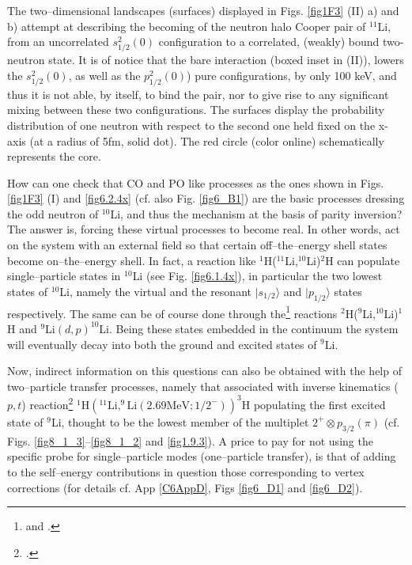  The two--dimensional landscapes (surfaces) displayed in Figs. \ref{fig1F3} (II) a) and b) attempt at describing the becoming of the neutron halo     Cooper pair  of  $^{11}$Li,  from an uncorrelated $s_{1/2}^2(0)$  configuration to a  correlated, (weakly) bound two-neutron state. It is of notice that  the bare interaction (boxed inset in  (II)), lowers the $s_{1/2}^2(0)$, as well as the $p_{1/2}^2(0)$) pure  configurations,  by  only 100 keV, and thus it is not able, by itself,  to bind the pair, nor to give rise to any significant mixing between these two configurations. The surfaces display  the probability distribution of one neutron with respect to the second one held fixed on the x-axis (at a radius of 5fm, solid dot). The red circle (color online) schematically represents the core.

How can one check that CO and PO like processes as the ones shown in Figs. \ref{fig1F3} (I) and \ref{fig6.2.4x} (cf. also Fig. \ref{fig6_B1}) are the basic processes dressing the odd neutron of $^{10}$Li, and thus the mechanism at the basis of parity inversion? The answer is, forcing these virtual processes to become real. In other words, act on the system with an external field so that certain off--the--energy shell states become on--the--energy shell. In fact, a reaction like $^1$H($^{11}$Li,$^{10}$Li)$^2$H can populate single--particle states in $^{10}$Li (see Fig. \ref{fig6.1.4x}), in particular the two lowest states of $^{10}$Li, namely the virtual and the resonant $|s_{1/2}\rangle$ and $|p_{1/2}\rangle$ states respectively. The same can be of course done through the\footnote{\cite{Orrigo:09} and \cite{Jeppesen:04,Cavallaro:17}.} reactions $^2$H($^9$Li,$^{10}$Li)$^1$H and $^9$Li$(d,p)^{10}$Li. Being these states embedded in the continuum the system will eventually decay into both the ground and excited states of $^9$Li. 



Now,  indirect information on this questions can also be obtained	 with the help of two--particle transfer processes, namely that associated with inverse kinematics ($p,t$) reaction\footnote{\cite{Tanihata:08}.} $^1\text{H}(^{11}\text{Li},^{9}\text{Li}(2.69\text{MeV};1/2^-))^3$H populating the first excited state of $^9$Li, thought to be the lowest member of the multiplet $2^+\otimes p_{3/2}(\pi)$  (cf. Figs. \ref{fig8_1_3}--\ref{fig8_1_2} and \ref{fig1.9.3}).
 A price to pay for not using the specific probe for single--particle modes (one--particle transfer), is that of adding to the self--energy contributions in question those corresponding to vertex corrections (for details cf. App \ref{C6AppD}, Figs \ref{fig6_D1} and \ref{fig6_D2}). 

